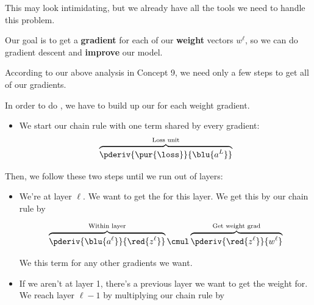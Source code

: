         This may look intimidating, but we already have all the tools we need to handle this problem.
        
        Our goal is to get a \textbf{gradient} for each of our \textbf{weight} vectors $w^\ell$, so we can do gradient descent and \textbf{improve} our model.
        
        According to our above analysis in Concept 9, we need only a few steps to get all of our gradients.
        
        \begin{concept}
            In order to do , we have to build up our  for each weight gradient.
            
            \begin{itemize}
                \item We start our chain rule with one term shared by every gradient: 
                    \begin{equation*}
                        \overbrace{
                            \pderiv {\pur{\loss}} {\blu{a^L}} 
                        }^{\text{Loss unit}}
                    \end{equation*}
            \end{itemize}
            
            Then, we follow these two steps until we run out of layers:
            \begin{itemize}
                \item We're at layer $\ell$. We want to get the  for this layer. We get this by  our chain rule by
                
                    \begin{equation*}
                        \overbrace{
                            \pderiv {\blu{a^\ell}} {\red{z^\ell}}
                        }^{\text{Within layer}}
                            \cmul
                        \overbrace{
                            \pderiv {\red{z^\ell}} {w^\ell}
                        }^{\text{Get weight grad}}
                    \end{equation*}
                    
                    We  this term for any other gradients we want.
                
                \item If we aren't at layer 1, there's a previous layer we want to get the weight for. We reach layer $\ell-1$ by multiplying our chain rule by 
                

\end{itemize}
\end{concept}
